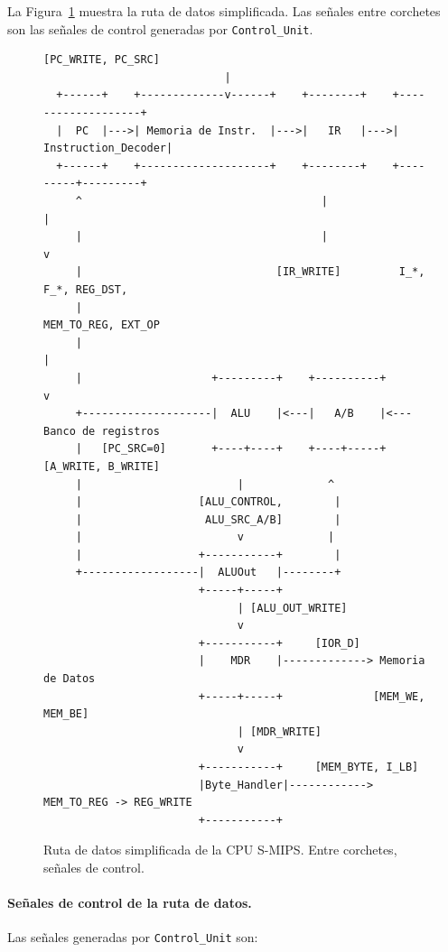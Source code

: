 \documentclass[11pt,a4paper]{article}
\begin{document}
La Figura~\ref{fig:datapath} muestra la ruta de datos simplificada. Las señales entre corchetes son las señales de control generadas por \texttt{Control\_Unit}.

\begin{figure}[htbp]
\centering
\begin{Verbatim}[fontsize=\small]
                    [PC_WRITE, PC_SRC]
                            |
  +------+    +-------------v------+    +--------+    +-------------------+
  |  PC  |--->| Memoria de Instr.  |--->|   IR   |--->| Instruction_Decoder|
  +------+    +--------------------+    +--------+    +---------+---------+
     ^                                     |                    |
     |                                     |                    v
     |                              [IR_WRITE]         I_*, F_*, REG_DST,
     |                                                 MEM_TO_REG, EXT_OP
     |                                                      |
     |                    +---------+    +----------+        v
     +--------------------|  ALU    |<---|   A/B    |<--- Banco de registros
     |   [PC_SRC=0]       +----+----+    +----+-----+     [A_WRITE, B_WRITE]
     |                        |             ^
     |                  [ALU_CONTROL,        |
     |                   ALU_SRC_A/B]        |
     |                        v             |
     |                  +-----------+        |
     +------------------|  ALUOut   |--------+
                        +-----+-----+
                              | [ALU_OUT_WRITE]
                              v
                        +-----------+     [IOR_D]
                        |    MDR    |-------------> Memoria de Datos
                        +-----+-----+              [MEM_WE, MEM_BE]
                              | [MDR_WRITE]
                              v
                        +-----------+     [MEM_BYTE, I_LB]
                        |Byte_Handler|------------> MEM_TO_REG -> REG_WRITE
                        +-----------+
\end{Verbatim}
\caption{Ruta de datos simplificada de la CPU S-MIPS. Entre corchetes, señales de control.}
\label{fig:datapath}
\end{figure}

\paragraph{Señales de control de la ruta de datos.}
Las señales generadas por \texttt{Control\_Unit} son:
\end{document}
